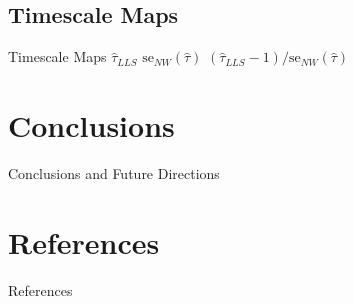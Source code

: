\documentclass[12pt]{beamer}
\begin{document}
\subsection{Timescale Maps}
\begin{frame}{Timescale Maps}
\scriptsize
$\hat \tau_{LLS}$
$\text{se}_{NW}(\hat \tau)$
$(\hat \tau_{LLS} - 1) / \text{se}_{NW}(\hat \tau)$
\end{frame}

\section{Conclusions}
\begin{frame}{Conclusions and Future Directions}
\end{frame}

\section{References}
\begin{frame}{References}
\end{frame}
\end{document}
